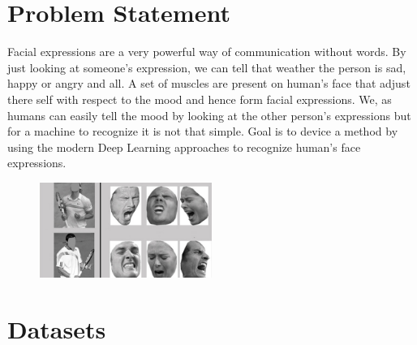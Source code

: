 \documentclass[11pt]{article}
\begin{document}
	\tableofcontents
	\newpage
	
	\section{Problem Statement}
		Facial expressions are a very powerful way of communication without words. By just looking at someone's expression, we can tell that weather the person is sad, happy or angry and all. A set of muscles are present on human's face that adjust there self with respect to the mood and hence form facial expressions. We, as humans can easily tell the mood by looking at the other person's expressions but for a machine to recognize it is not that simple.
		\newline
		\newline
		Goal is to device a method by using the modern Deep Learning approaches to recognize human's face expressions.
		\newline
		\newline
		\newline
		\newline
		\begin{figure}[ht]
			\centering
			\includegraphics[width=0.5\textwidth]{problem_st}
		\end{figure}
		
		\newpage
		
	\section{Datasets}
\end{document}
